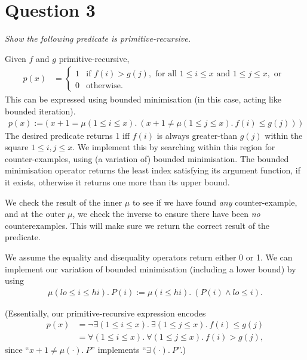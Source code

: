 \documentclass[a4paper]{article}
\begin{document}
\section*{Question 3}
\begin{center}
  \textit{Show the following predicate is primitive-recursive.}
\end{center}
Given $f$ and $g$ primitive-recursive,
\begin{align*}
  p(x) &= \begin{cases}
    1 & \text{if } f(i) > g(j),\text{ for all } 1 \le i \le x \text{ and } 1 \le j \le x,\text{ or } \\
    0 & \text{otherwise.}
  \end{cases}
\end{align*}
This can be expressed using bounded minimisation
(in this case, acting like bounded iteration).
\begin{align*}
  p(x) := \big(~x+1 = \mu(1\le i \le x).~(x+1 \ne \mu(1\le j \le x).~f(i) \le g(j))~\big)
\end{align*}
The desired predicate returns 1 iff $f(i)$ is always
greater-than $g(j)$ within
the square $1 \le i,j \le x$.
We implement this by searching within this region for counter-examples,
using (a variation of) bounded minimisation.
The bounded minimisation operator returns the least index satisfying its
argument function, if it exists, otherwise it returns one more than its upper bound.

We check the result of the inner $\mu$ to see if we have found \textit{any} counter-example,
and at the outer $\mu$, we check the inverse to ensure there have been \textit{no} counterexamples.
This will make sure we return the correct result of the predicate.

We assume the equality and disequality operators return either 0 or 1.
We can implement our variation of bounded minimisation (including a lower bound)
by using
\begin{align*}
\mu (lo \le i \le hi).~P(i) := \mu (i \le hi).~(P(i) \wedge lo \le i).
\end{align*}

(Essentially, our primitive-recursive expression encodes
\begin{align*}
  p(x) &= \neg \exists(1 \le i \le x).~\exists(1 \le j \le x).~f(i) \le g(j) \\
       &= \forall(1 \le i \le x).~\forall(1 \le j \le x).~f(i) > g(j),
\end{align*}
since ``$x + 1 \ne \mu(\cdot).~P$'' implements ``$\exists(\cdot).~P$''.)
\end{document}
